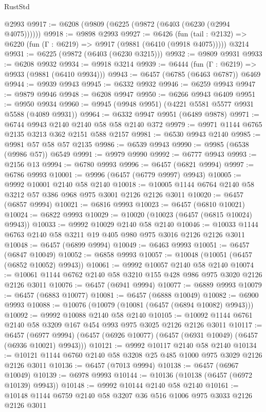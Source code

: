 \begin{lexlean}{RustStd}
\begin{coremodule}
    @2993
@9917 := @6208 (@9809 (@6225 (@9872 (@6403 (@6230 (@2994 @4075))))))
@9918 := @9898 @2993
@9927 := @6426
    (fun (tail : @2132) => @6220 (fun (Γ : @6219) => @9917 (@9881 (@6410 (@9918 @4075)))))
    @3214
@9931 := @6225 (@9872 (@6403 (@6230 @3215)))
@9932 := @9809 @9931
@9933 := @6208 @9932
@9934 := @9918 @3214
@9939 := @6444 (fun (Γ : @6219) => @9933 (@9881 (@6410 @9934)))
@9943 := @6457 (@6785 (@6463 @6787)) @6469
@9944 := @9939 @9943
@9945 := @6332 @9932
@9946 := @6259 @9943
@9947 := @9879 @9946
@9948 := @6208 @9947
@9950 := @6266 @9943 @6409
@9951 := @9950 @9934
@9960 := @9945 (@9948 @9951) (@4221 @5581 @5577 @9931 @5588 (@4089 @9931))
@9964 := @6332 @9947 @9951 (@6489 @9878)
@9971 := @6744 @9943 @2140 @2140 @58 @58 @2140 @372
@9979 := @9971 @1144 @6765 @2135 @3213 @362 @2151 @588 @2157
@9981 := @6530 @9943 @2140
@9985 := @9981 @57 @58 @57 @2135
@9986 := @6539 @9943
@9990 := @9985 (@6538 (@9986 @57)) @6549
@9991 := @9979 @9990
@9992 := @6777 @9943
@9993 := @2156 @13
@9994 := @6780 @9993
@9996 := @6457 (@6821 @9994)
@9997 := @6786 @9993
@10001 := @9996 (@6457 (@6779 @9997) @9943)
@10005 := @9992 @10001 @2140 @58 @2140
@10018 := @10005 @1144 @6764 @2140 @58 @3212 @57 @386 @968 @975 @3001 @2126 @2126 @3011
@10020 := @6457 (@6857 @9994)
@10021 := @6816 @9993
@10023 := @6457 (@6810 @10021)
@10024 := @6822 @9993
@10029 := @10020 (@10023 (@6457 (@6815 @10024) @9943))
@10033 := @9992 @10029 @2140 @58 @2140
@10046 := @10033 @1144 @6763 @2140 @58 @3211 @19 @405 @980 @975 @3016 @2126 @2126 @3011
@10048 := @6457 (@6899 @9994)
@10049 := @6463 @9993
@10051 := @6457 (@6847 @10049)
@10052 := @6858 @9993
@10057 := @10048 (@10051 (@6457 (@6852 @10052) @9943))
@10061 := @9992 @10057 @2140 @58 @2140
@10074 := @10061 @1144 @6762 @2140 @58 @3210 @155 @428 @986 @975 @3020 @2126 @2126 @3011
@10076 := @6457 (@6941 @9994)
@10077 := @6889 @9993
@10079 := @6457 (@6883 @10077)
@10081 := @6457 (@6888 @10049)
@10082 := @6900 @9993
@10088 := @10076 (@10079 (@10081 (@6457 (@6894 @10082) @9943)))
@10092 := @9992 @10088 @2140 @58 @2140
@10105 := @10092 @1144 @6761 @2140 @58 @3209 @167 @454 @993 @975 @3025 @2126 @2126 @3011
@10117 := @6457
    (@6977 @9994)
    (@6457 (@6926 @10077) (@6457 (@6931 @10049) (@6457 (@6936 @10021) @9943)))
@10121 := @9992 @10117 @2140 @58 @2140
@10134 := @10121 @1144 @6760 @2140 @58 @3208 @25 @485 @1000 @975 @3029 @2126 @2126 @3011
@10136 := @6457 (@7013 @9994)
@10138 := @6457 (@6967 @10049)
@10139 := @6978 @9993
@10144 := @10136 (@10138 (@6457 (@6972 @10139) @9943))
@10148 := @9992 @10144 @2140 @58 @2140
@10161 := @10148 @1144 @6759 @2140 @58 @3207 @36 @516 @1006 @975 @3033 @2126 @2126 @3011

\end{coremodule}
\end{lexlean}

